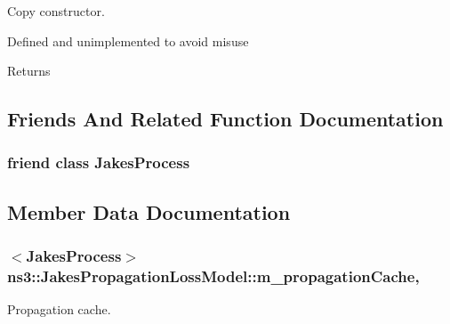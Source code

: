 Copy constructor. 

Defined and unimplemented to avoid misuse \begin{DoxyReturn}{Returns}

\end{DoxyReturn}


\subsection{Friends And Related Function Documentation}
\subsubsection[{\texorpdfstring{Jakes\+Process}{JakesProcess}}]{\setlength{\rightskip}{0pt plus 5cm}friend class {\bf Jakes\+Process}\hspace{0.3cm}{\ttfamily [friend]}}\hypertarget{classns3_1_1JakesPropagationLossModel_a6038e98faf969357bc5669579aa2fd04}{}\label{classns3_1_1JakesPropagationLossModel_a6038e98faf969357bc5669579aa2fd04}


\subsection{Member Data Documentation}
\subsubsection[{\texorpdfstring{m\+\_\+propagation\+Cache}{m_propagationCache}}]{$<${\bf Jakes\+Process}$>$ ns3\+::\+Jakes\+Propagation\+Loss\+Model\+::m\+\_\+propagation\+Cache\hspace{0.3cm}{\ttfamily [mutable]}, {\ttfamily [private]}}\hypertarget{classns3_1_1JakesPropagationLossModel_a4b5341c01d569a9e7b5274eae017126d}{}\label{classns3_1_1JakesPropagationLossModel_a4b5341c01d569a9e7b5274eae017126d}


Propagation cache. 

